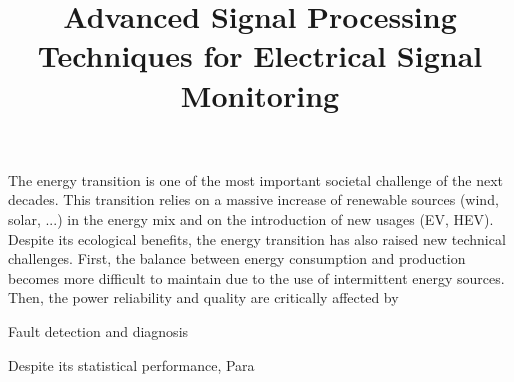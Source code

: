\documentclass{article}
\begin{document}
\title{Advanced Signal Processing Techniques for Electrical Signal Monitoring}
   
 \maketitle  
 
The energy transition is one of the most important societal challenge of the next decades. This transition relies on a massive increase of renewable sources (wind, solar, ...) in the energy mix and on the introduction of new usages (EV, HEV). Despite its ecological benefits, the energy transition has also raised new technical challenges. First, the balance between energy consumption and production becomes more difficult to maintain due to the use of intermittent energy sources. Then, the power reliability and quality are critically affected by 


Fault detection and diagnosis

Despite its statistical performance, Para



   
\end{document}
